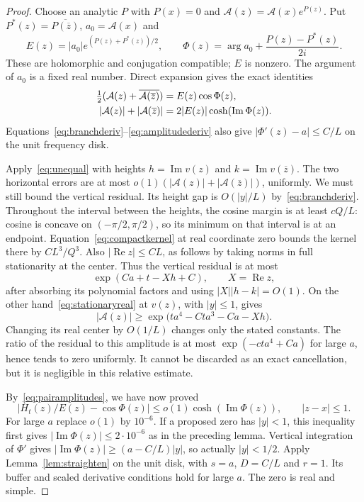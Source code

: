 \documentclass[11pt]{article}
\theoremstyle{remark}\newtheorem{remark}[theorem]{Remark}
\DeclareMathOperator{\Rea}{Re}\DeclareMathOperator{\Ima}{Im}
\begin{document}
\begin{proof}
Choose an analytic $P$ with $P(x)=0$ and
$\mathcal A(z)=\mathcal A(x)e^{P(z)}$. Put
$P^*(z)=\overline{P(\overline z)}$, $a_0=\mathcal A(x)$ and
\[
 E(z)=|a_0|e^{(P(z)+P^*(z))/2},\qquad
 \Phi(z)=\arg a_0+\frac{P(z)-P^*(z)}{2i}.
\]
These are holomorphic and conjugation compatible; $E$ is
nonzero. The argument of $a_0$ is a fixed real number.
Direct expansion gives the exact identities
\begin{align}\label{eq:pairamplitudes}
 \tfrac12(\mathcal A(z)+\overline{\mathcal A(\overline z)})
          &=E(z)\cos\Phi(z),\notag\\
 |\mathcal A(z)|+|\mathcal A(\overline z)|
          &=2|E(z)|\cosh(\Ima\Phi(z)).
\end{align}
Equations~\eqref{eq:branchderiv}--\eqref{eq:amplitudederiv}
also give $|\Phi'(z)-a|\leq C/L$ on the unit frequency disk.

Apply~\eqref{eq:unequal} with heights
$h=\Ima v(z)$ and $k=\Ima v(\overline z)$.
The two horizontal errors are at most
$o(1)(|\mathcal A(z)|+|\mathcal A(\overline z)|)$, uniformly.
We must still bound the vertical residual. Its height gap is
$O(|y|/L)$ by~\eqref{eq:branchderiv}.
Throughout the interval between the heights, the cosine margin
is at least $cQ/L$: cosine is concave on $(-\pi/2,\pi/2)$,
so its minimum on that interval is at an endpoint.
Equation~\eqref{eq:compactkernel} at real coordinate zero
bounds the kernel there by $CL^3/Q^3$. Also
$|\Rea z|\leq CL$, as follows by taking norms in full
stationarity at the center. Thus the vertical residual is at most
\[
 \exp(Ca+t-Xh+C),\qquad X=\Rea z,
\]
after absorbing its polynomial factors and using
$|X||h-k|=O(1)$.
On the other hand~\eqref{eq:stationaryreal} at $v(z)$, with
$|y|\leq1$, gives
\[
 |\mathcal A(z)|\geq
 \exp\bigl(ta^4-Cta^3-Ca-Xh\bigr).
\]
Changing its real center by $O(1/L)$ changes only the stated
constants. The ratio of the residual to this amplitude is
at most $\exp(-ct a^4+Ca)$ for large $a$, hence tends to zero
uniformly. It cannot be discarded as an exact cancellation,
but it is negligible in this relative estimate.

By~\eqref{eq:pairamplitudes}, we have now proved
\[
 |H_t(z)/E(z)-\cos\Phi(z)|
       \leq o(1)\cosh(\Ima\Phi(z)),\qquad |z-x|\leq1.
\]
For large $a$ replace $o(1)$ by $10^{-6}$.
If a proposed zero has $|y|<1$, this inequality first gives
$|\Ima\Phi(z)|\leq2\cdot10^{-6}$ as in the preceding lemma.
Vertical integration of $\Phi'$ gives
$|\Ima\Phi(z)|\geq(a-C/L)|y|$, so actually $|y|<1/2$.
Apply Lemma~\ref{lem:straighten} on the unit disk, with
$s=a$, $D=C/L$ and $r=1$. Its buffer and scaled derivative
conditions hold for large $a$. The zero is real and simple.
\end{proof}
\end{document}
